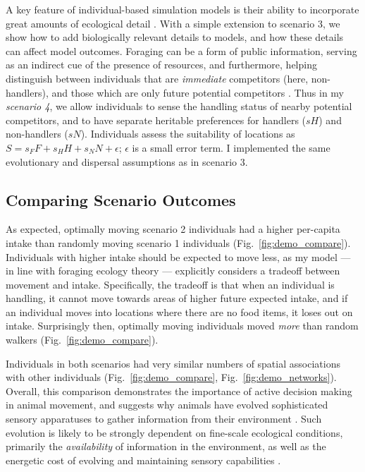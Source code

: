 \begin{interludeenv}
A key feature of individual-based simulation models is their ability to incorporate great amounts of ecological detail \citep{deangelis2019}.
With a simple extension to scenario 3, we show how to add biologically relevant details to models, and how these details can affect model outcomes.
Foraging can be a form of public information, serving as an indirect cue of the presence of resources, and furthermore, helping distinguish between individuals that are \textit{immediate} competitors (here, non-handlers), and those which are only future potential competitors \citep[][; here, handlers]{dall2005,giraldeau2018,beauchamp2008,beauchamp2013}.
Thus in my \textit{scenario 4}, we allow individuals to sense the handling status of nearby potential competitors, and to have separate heritable preferences for handlers ($sH$) and non-handlers ($sN$).
Individuals assess the suitability of locations as $S = s_FF + s_HH + s_NN + \epsilon$; $\epsilon$ is a small error term.
I implemented the same evolutionary and dispersal assumptions as in scenario 3.

\subsection*{Comparing Scenario Outcomes}

As expected, optimally moving scenario 2 individuals had a higher per-capita intake than randomly moving scenario 1 individuals (Fig.~\ref{fig:demo_compare}).
Individuals with higher intake should be expected to move less, as my model --- in line with foraging ecology theory \citep{charnov1976} --- explicitly considers a tradeoff between movement and intake.
Specifically, the tradeoff is that when an individual is handling, it cannot move towards areas of higher future expected intake, and if an individual moves into locations where there are no food items, it loses out on intake.
Surprisingly then, optimally moving individuals moved \textit{more} than random walkers (Fig.~\ref{fig:demo_compare}).

Individuals in both scenarios had very similar numbers of spatial associations with other individuals (Fig.~\ref{fig:demo_compare}, Fig.~\ref{fig:demo_networks}).
Overall, this comparison demonstrates the importance of active decision making in animal movement, and suggests why animals have evolved sophisticated sensory apparatuses to gather information from their environment \citep{avgar2013,berger2022,mann2021,swain2021}.
Such evolution is likely to be strongly dependent on fine-scale ecological conditions, primarily the \textit{availability} of information in the environment, as well as the energetic cost of evolving and maintaining sensory capabilities \citep{swain2021}.


\end{interludeenv}
